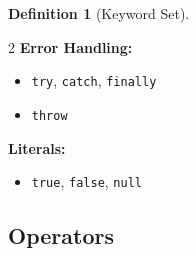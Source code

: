 \documentclass[12pt,a4paper]{article}
\theoremstyle{definition}
\newtheorem{definition}{Definition}[section]
\begin{document}
\begin{definition}[Keyword Set]
\begin{multicols}{2}
\textbf{Error Handling:}
\begin{itemize}[noitemsep]
    \item \texttt{try}, \texttt{catch}, \texttt{finally}
    \item \texttt{throw}
\end{itemize}

\textbf{Literals:}
\begin{itemize}[noitemsep]
    \item \texttt{true}, \texttt{false}, \texttt{null}
\end{itemize}
\end{multicols}
\end{definition}

\subsection{Operators}
\end{document}
